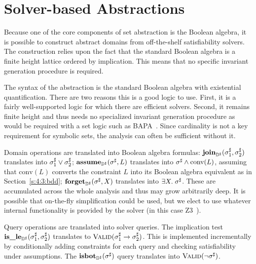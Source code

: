 \section{Solver-based Abstractions}
\label{sec:solvers}

Because one of the core components of set abstraction is the Boolean algebra, it is possible to construct abstract domains from off-the-shelf satisfiability solvers.  The construction relies upon the fact that the standard Boolean algebra is a finite height lattice ordered by implication.  This means that no specific invariant generation procedure is required.

The syntax of the abstraction is the standard Boolean algebra with existential quantification.  There are two reasons this is a good logic to use.  First, it is a fairly well-supported logic for which there are efficient solvers.  Second, it remains finite height and thus needs no specialized invariant generation procedure as would be required with a set logic such as BAPA~\cite{knr:jar:06}.  Since cardinality is not a key requirement for symbolic sets, the analysis can often be sufficient without it.

Domain operations are translated into Boolean algebra formulas:
$\textbf{join}_{{\mathbb{D}}^{\sharp}}({\sigma}^{\sharp}_1,{\sigma}^{\sharp}_2)$ translates into ${\sigma}^{\sharp}_1 \vee {\sigma}^{\sharp}_2$;
$\textbf{assume}_{{\mathbb{D}}^{\sharp}}({\sigma}^{\sharp}, L)$ translates into ${\sigma}^{\sharp} \wedge \textrm{conv}(L)$,
assuming that $\textrm{conv}(L)$ converts the constraint $L$ into its Boolean
algebra equivalent as in Section~\ref{s:4:3:bdd};
$\textbf{forget}_{{\mathbb{D}}^{\sharp}}({\sigma}^{\sharp}, X)$ translates into $\exists X. \; {\sigma}^{\sharp}$.
These are accumulated across the whole analysis and thus may grow
arbitrarily deep.
It is possible that on-the-fly simplification could be used, but we elect
to use whatever internal functionality is provided by the solver (in this
case Z3~\cite{mb:tacas:08}).

Query operations are translated into solver queries.
The implication test $\textbf{is\_le}_{{\mathbb{D}}^{\sharp}}({\sigma}^{\sharp}_1, {\sigma}^{\sharp}_2)$ translates to
$\textsc{Valid}({\sigma}^{\sharp}_1 \rightarrow {\sigma}^{\sharp}_2)$.
This is implemented incrementally by conditionally adding constraints
for each query and checking satisfiability under assumptions.
The $\textbf{isbot}_{{\mathbb{D}}^{\sharp}}({\sigma}^{\sharp})$ query translates into $\textsc{Valid}(\neg {\sigma}^{\sharp})$.

